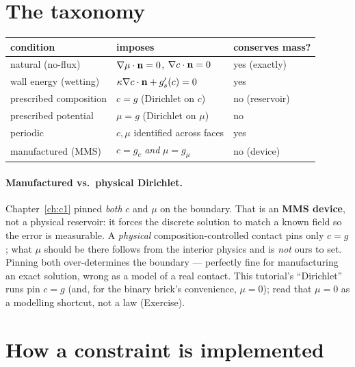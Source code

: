 \section{The taxonomy}

\begin{center}\small
\begin{tabular}{lll}
\toprule
condition & imposes & conserves mass? \\
\midrule
natural (no-flux) & $\nabla\mu\cdot\mathbf n=0$, $\nabla c\cdot\mathbf n=0$ & yes (exactly) \\
wall energy (wetting) & $\kappa\nabla c\cdot\mathbf n+g_s'(c)=0$ & yes \\
prescribed composition & $c = g$ (Dirichlet on $c$) & no (reservoir) \\
prescribed potential & $\mu = g$ (Dirichlet on $\mu$) & no \\
periodic & $c,\mu$ identified across faces & yes \\
manufactured (MMS) & $c=g_c$ \emph{and} $\mu=g_\mu$ & no (device) \\
\bottomrule
\end{tabular}
\end{center}

\paragraph{Manufactured vs.\ physical Dirichlet.}
Chapter~\ref{ch:c1} pinned \emph{both} $c$ and $\mu$ on the boundary.
That is an \textbf{MMS device}, not a physical reservoir: it forces the
discrete solution to match a known field so the error is measurable. A
\emph{physical} composition-controlled contact pins only $c=g$; what $\mu$
should be there follows from the interior physics and is \emph{not} ours
to set. Pinning both over-determines the boundary --- perfectly fine for
manufacturing an exact solution, wrong as a model of a real contact. This
tutorial's ``Dirichlet'' runs pin $c=g$ (and, for the binary brick's
convenience, $\mu=0$); read that $\mu=0$ as a modelling shortcut, not a
law (Exercise).

\section{How a constraint is implemented}

